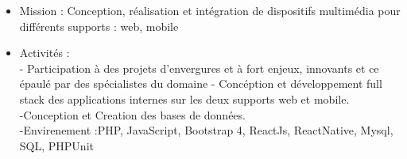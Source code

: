 \documentclass[10pt,a4paper]{altacv}
\begin{document}
\tagline{}


\begin{fullwidth}
\makecvheader
\end{fullwidth}



\begin{itemize}
\item Mission : Conception, réalisation et intégration de dispositifs multimédia pour différents supports : web, mobile
\item Activités :\\
- Participation à des projets d’envergures et à fort enjeux, innovants et ce épaulé par des spécialistes du domaine
- Concéption et développement full stack des applications internes sur les deux supports web et mobile.\\
-Conception et Creation des bases de données.\\
-Envirenement :PHP, JavaScript, Bootstrap 4, ReactJs, ReactNative, Mysql, SQL, PHPUnit

\end{itemize}

\divider
\end{document}

